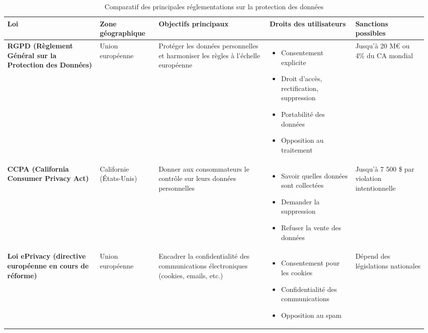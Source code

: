 \documentclass{article}
\begin{document}
\begin{table}[h!]
\centering
\renewcommand{\arraystretch}{1.4}
\begin{tabular}{>{\bfseries}m{3.0cm} m{2.0cm} m{3.5cm} m{4.5cm} m{2.5cm}}
\toprule
Loi & Zone géographique & Objectifs principaux & Droits des utilisateurs & Sanctions possibles \\
\midrule
RGPD \newline (Règlement Général sur la Protection des Données) 
& Union européenne 
& Protéger les données personnelles et harmoniser les règles à l’échelle européenne 
& \begin{itemize}
    \item Consentement explicite
    \item Droit d'accès, rectification, suppression
    \item Portabilité des données
    \item Opposition au traitement
\end{itemize}
& Jusqu’à 20 M€ ou 4\% du CA mondial \\
\midrule
CCPA \newline (California Consumer Privacy Act) 
& Californie (États-Unis) 
& Donner aux consommateurs le contrôle sur leurs données personnelles 
& \begin{itemize}
    \item Savoir quelles données sont collectées
    \item Demander la suppression
    \item Refuser la vente des données
\end{itemize}
& Jusqu’à 7 500 \$ par violation intentionnelle \\
\midrule
Loi ePrivacy \newline (directive européenne en cours de réforme) 
& Union européenne 
& Encadrer la confidentialité des communications électroniques (cookies, emails, etc.) 
& \begin{itemize}
    \item Consentement pour les cookies
    \item Confidentialité des communications
    \item Opposition au spam
\end{itemize}
& Dépend des législations nationales \\
\bottomrule
\end{tabular}
\caption{Comparatif des principales réglementations sur la protection des données}
\end{table}
\end{document}
